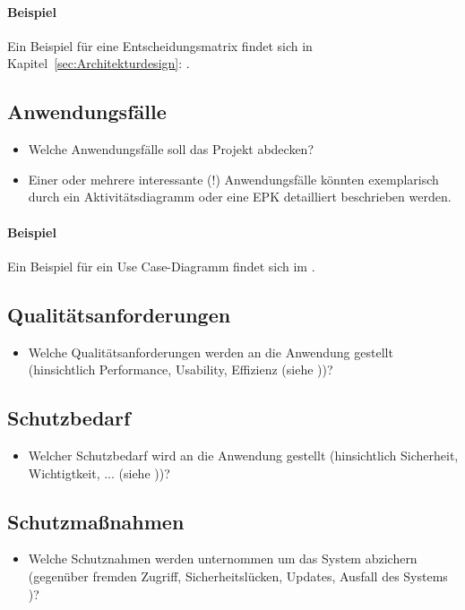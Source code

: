 \paragraph{Beispiel}
Ein Beispiel für eine Entscheidungsmatrix findet sich in Kapitel~\ref{sec:Architekturdesign}: .


\subsection{Anwendungsfälle}
\label{sec:Anwendungsfaelle}
\begin{itemize}
	\item Welche Anwendungsfälle soll das Projekt abdecken?
	\item Einer oder mehrere interessante (!) Anwendungsfälle könnten exemplarisch durch ein Aktivitätsdiagramm oder eine \ac{EPK} detailliert beschrieben werden. 
\end{itemize}

\paragraph{Beispiel}
Ein Beispiel für ein Use Case-Diagramm findet sich im .


\subsection{Qualitätsanforderungen}
\label{sec:Qualitaetsanforderungen}
\begin{itemize}
	\item Welche Qualitätsanforderungen werden an die Anwendung gestellt (\zB hinsichtlich Performance, Usability, Effizienz \etc (siehe \citet{ISO9126}))?
\end{itemize}

\subsection{Schutzbedarf}
\label{sec:Schutzbedarf}
\begin{itemize}
	\item Welcher Schutzbedarf  wird an die Anwendung gestellt (\zB hinsichtlich Sicherheit, Wichtigtkeit, ... \etc (siehe \citet{BSI-S-200-2}))?
\end{itemize}

\subsection{Schutzmaßnahmen}
\label{sec:Schutzmaßnahmen}
\begin{itemize}
	\item Welche Schutznahmen werden unternommen um das System abzichern (\zB gegenüber fremden Zugriff, Sicherheitslücken, Updates, Ausfall des Systems \etc)?
\end{itemize}

